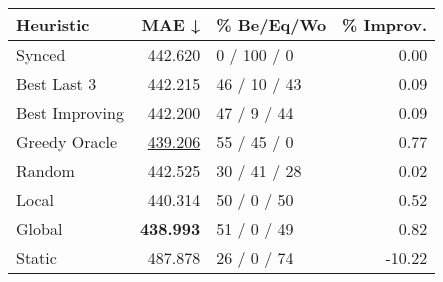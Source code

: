 \begin{tabular}{lrlr}
\toprule
\textbf{Heuristic} & \textbf{MAE ↓} & \textbf{\% Be/Eq/Wo} & \textbf{\% Improv.} \\
\midrule
            Synced &        442.620 &          0 / 100 / 0 &                0.00 \\
\midrule
       Best Last 3 &        442.215 &         46 / 10 / 43 &                0.09 \\
    Best Improving &        442.200 &          47 / 9 / 44 &                0.09 \\
\addlinespace
     Greedy Oracle &        \underline{439.206} &          55 / 45 / 0 &                0.77 \\
            Random &        442.525 &         30 / 41 / 28 &                0.02 \\
\midrule
             Local &        440.314 &          50 / 0 / 50 &                0.52 \\
            Global &        \textbf{438.993} &          51 / 0 / 49 &                0.82 \\
\midrule
            Static &        487.878 &          26 / 0 / 74 &              -10.22 \\
\bottomrule
\end{tabular}

\label{tab:iid_lr05_le1_bs4_Summary}
